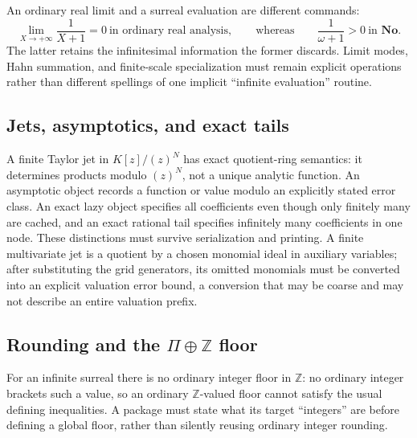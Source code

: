 \documentclass[11pt,letterpaper]{article}
\numberwithin{equation}{section}
\theoremstyle{definition}
\theoremstyle{remark}
\newcommand{\No}{\mathbf{No}}
\newcommand{\Z}{\mathbb Z}
\begin{document}
An ordinary real limit and a surreal evaluation are different commands:
\[
 \lim_{X\to+\infty}\frac1{X+1}=0\ \text{in ordinary real analysis},
 \qquad\text{whereas}\qquad
 \frac1{\omega+1}>0\ \text{in }\No .
\]
The latter retains the infinitesimal information the former discards. Limit
modes, Hahn summation, and finite-scale specialization must remain explicit
operations rather than different spellings of one implicit ``infinite
evaluation'' routine.

\subsection{Jets, asymptotics, and exact tails}
\label{cas:sub-jets}
A finite Taylor jet in $K[z]/(z)^N$ has exact quotient-ring semantics: it
determines products modulo $(z)^N$, not a unique analytic function. An
asymptotic object records a function or value modulo an explicitly stated error
class. An exact lazy object specifies all coefficients even though only finitely
many are cached, and an exact rational tail specifies infinitely many
coefficients in one node. These distinctions must survive serialization and
printing. A finite multivariate jet is a quotient by a chosen monomial ideal in
auxiliary variables; after substituting the grid generators, its omitted
monomials must be converted into an explicit valuation error bound, a conversion
that may be coarse and may not describe an entire valuation prefix.

\subsection{Rounding and the \texorpdfstring{$\Pi\oplus\Z$}{Pi + Z} floor}
\label{cas:sub-floor}
For an infinite surreal there is no ordinary integer floor in $\Z$: no ordinary
integer brackets such a value, so an ordinary $\Z$-valued floor cannot satisfy
the usual defining inequalities. A package must state what its target
``integers'' are before defining a global floor, rather than silently reusing
ordinary integer rounding.
\end{document}
